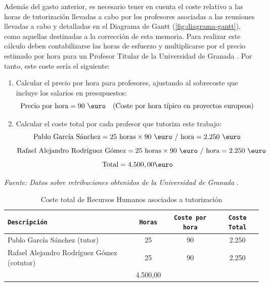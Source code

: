 Además del gasto anterior, es necesario tener en cuenta el coste relativo a las horas de tutorización llevadas a cabo por los profesores asociadas a las reuniones llevadas a cabo y detalladas en el Diagrama de Gantt (\ref{fig:diagrama-gantt}), como aquellas destinadas a la corrección de esta memoria. Para realizar este cálculo deben contabilizarse las horas de esfuerzo y multiplicarse por el precio estimado por hora para un Profesor Titular de la Universidad de Granada \cite{ugr2023retribuciones}. Por tanto, este coste sería el siguiente:

\begin{enumerate}
\item Calcular el precio por hora para profesores, ajustando al sobrecoste que incluye los salarios en presupuestos:
\[
\text{Precio por hora} = 90 \text{ \euro} \quad (\text{Coste por hora típico en proyectos europeos})
\]

\item Calcular el coste total por cada profesor que tutoriza este trabajo:
\[
\text{Pablo García Sánchez} = 25 \text{ horas} \times 90 \text{ \euro / hora} = 2.250 \text{ \euro}
\]
\[
\text{Rafael Alejandro Rodríguez Gómez} = 25 \text{ horas} \times 90 \text{ \euro / hora} = 2.250 \text{ \euro}
\]
    \[
    \text{Total} = 4.500,00 \text{\euro}
    \]
\end{enumerate}

\textit{Fuente: Datos sobre retribuciones obtenidos de la Universidad de Granada} \cite{ugr2023retribuciones}.

\begin{table}[H]
    \centering
    \footnotesize
    \begin{tabularx}{\linewidth}{|>{\raggedright\arraybackslash}X|c|c|c|}
    \hline
    \rowcolor{graylight}\texttt{Descripción} & \texttt{Horas} & \texttt{Coste por hora} & \texttt{Coste Total} \\
    \hline
    Pablo García Sánchez (tutor) & 25 & 90 \text{\euro} & 2.250 \text{\euro} \\
    \hline
    Rafael Alejandro Rodríguez Gómez (cotutor) & 25 & 90 \text{\euro} & 2.250 \text{\euro} \\
    \hline
    \rowcolor{graylight}\multicolumn{3}{|r|}{\textbf{Coste total en tutorización}} & 4.500,00 \text{\euro} \\
    \hline
    \end{tabularx}
    \caption{Coste total de Recursos Humanos asociados a tutorización}
    \label{tab:coste-tutorizacion}
\end{table}





